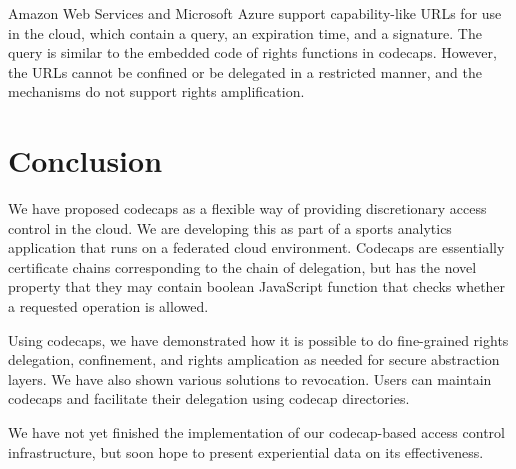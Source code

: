 \documentclass[10pt, conference, compsocconf]{IEEEtran}
\begin{document}
Amazon Web Services and Microsoft Azure support capability-like URLs
for use in the
cloud, which contain a query, an expiration time, and a signature.
The query is similar
to the embedded code of rights functions in codecaps.  However, the
URLs cannot be confined or be delegated in a restricted manner, and
the mechanisms do not support rights amplification.

\section{Conclusion}

We have proposed codecaps as a flexible 
way of providing discretionary access control in the cloud.  We are developing this
as part of a sports analytics application that runs on a federated
cloud environment.  
Codecaps are essentially certificate chains corresponding to the chain of delegation,
but has the novel property that they may contain boolean JavaScript function that checks whether a requested operation is allowed.



Using codecaps, we have demonstrated how it is possible to do
fine-grained rights delegation, confinement, and rights amplication
as needed for secure abstraction layers.  We have also shown various
solutions to revocation.  Users can maintain codecaps and facilitate
their delegation using codecap directories.

We have not yet finished the implementation of our codecap-based access
control infrastructure, but soon hope to present experiential
data on its effectiveness.



\end{document}
